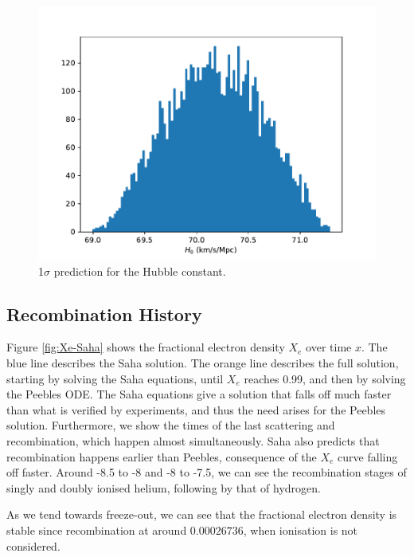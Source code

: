 \documentclass{aa}
\begin{document}
\begin{figure}[ht]
\centering
\includegraphics[width=\hsize]{figures/histogram.pdf}
  \caption{1$\sigma$ prediction for the Hubble constant.}
     \label{fit:hist}
\end{figure}

\subsection{Recombination History}

Figure \ref{fig:Xe-Saha} shows the fractional electron density $X_e$ over time $x$. The blue line describes the Saha solution. The orange line describes the full solution, starting by solving the Saha equations, until $X_e$ reaches 0.99, and then by solving the Peebles ODE. The Saha equations give a solution that falls off much faster than what is verified by experiments, and thus the need arises for the Peebles solution. Furthermore, we show the times of the last scattering and recombination, which happen almost simultaneously. Saha also predicts that recombination happens earlier than Peebles, consequence of the $X_e$ curve falling off faster. Around -8.5 to -8 and -8 to -7.5, we can see the recombination stages of singly and doubly ionised helium, following by that of hydrogen.

As we tend towards freeze-out, we can see that the fractional electron density is stable since recombination at around $0.00026736$, when ionisation is not considered.
\end{document}
